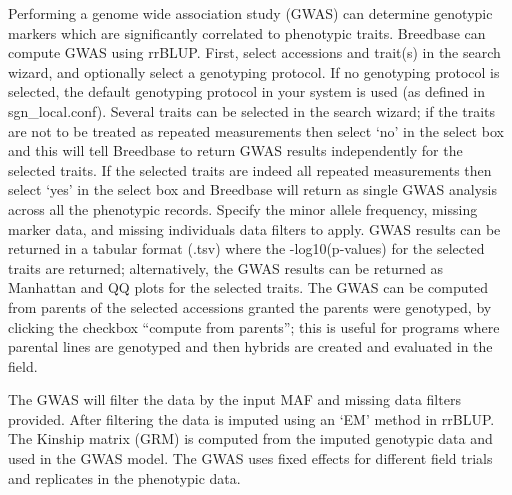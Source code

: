 \documentclass[
  12pt,
]{book}
\begin{document}
Performing a genome wide association study (GWAS) can determine genotypic markers which are significantly correlated to phenotypic traits. Breedbase can compute GWAS using rrBLUP. First, select accessions and trait(s) in the search wizard, and optionally select a genotyping protocol. If no genotyping protocol is selected, the default genotyping protocol in your system is used (as defined in sgn\_local.conf). Several traits can be selected in the search wizard; if the traits are not to be treated as repeated measurements then select `no' in the select box and this will tell Breedbase to return GWAS results independently for the selected traits. If the selected traits are indeed all repeated measurements then select `yes' in the select box and Breedbase will return as single GWAS analysis across all the phenotypic records. Specify the minor allele frequency, missing marker data, and missing individuals data filters to apply. GWAS results can be returned in a tabular format (.tsv) where the -log10(p-values) for the selected traits are returned; alternatively, the GWAS results can be returned as Manhattan and QQ plots for the selected traits. The GWAS can be computed from parents of the selected accessions granted the parents were genotyped, by clicking the checkbox ``compute from parents''; this is useful for programs where parental lines are genotyped and then hybrids are created and evaluated in the field.

The GWAS will filter the data by the input MAF and missing data filters provided. After filtering the data is imputed using an `EM' method in rrBLUP. The Kinship matrix (GRM) is computed from the imputed genotypic data and used in the GWAS model. The GWAS uses fixed effects for different field trials and replicates in the phenotypic data.
\end{document}
